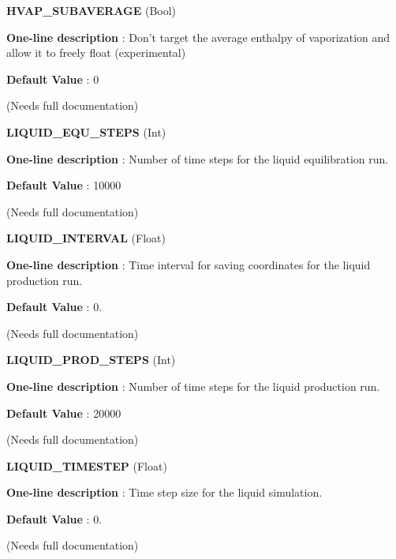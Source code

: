 \begin{DoxyItemize}
\item {\bfseries  \-H\-V\-A\-P\-\_\-\-S\-U\-B\-A\-V\-E\-R\-A\-G\-E } (\-Bool) \par
{\bfseries  \-One-\/line description }\-: \-Don't target the average enthalpy of vaporization and allow it to freely float (experimental) \par
{\bfseries  \-Default \-Value }\-: 0 \par
(\-Needs full documentation)\end{DoxyItemize}
\begin{DoxyItemize}
\item {\bfseries  \-L\-I\-Q\-U\-I\-D\-\_\-\-E\-Q\-U\-\_\-\-S\-T\-E\-P\-S } (\-Int) \par
{\bfseries  \-One-\/line description }\-: \-Number of time steps for the liquid equilibration run. \par
{\bfseries  \-Default \-Value }\-: 10000 \par
(\-Needs full documentation)\end{DoxyItemize}
\begin{DoxyItemize}
\item {\bfseries  \-L\-I\-Q\-U\-I\-D\-\_\-\-I\-N\-T\-E\-R\-V\-A\-L } (\-Float) \par
{\bfseries  \-One-\/line description }\-: \-Time interval for saving coordinates for the liquid production run. \par
{\bfseries  \-Default \-Value }\-: 0. \par
(\-Needs full documentation)\end{DoxyItemize}
\begin{DoxyItemize}
\item {\bfseries  \-L\-I\-Q\-U\-I\-D\-\_\-\-P\-R\-O\-D\-\_\-\-S\-T\-E\-P\-S } (\-Int) \par
{\bfseries  \-One-\/line description }\-: \-Number of time steps for the liquid production run. \par
{\bfseries  \-Default \-Value }\-: 20000 \par
(\-Needs full documentation)\end{DoxyItemize}
\begin{DoxyItemize}
\item {\bfseries  \-L\-I\-Q\-U\-I\-D\-\_\-\-T\-I\-M\-E\-S\-T\-E\-P } (\-Float) \par
{\bfseries  \-One-\/line description }\-: \-Time step size for the liquid simulation. \par
{\bfseries  \-Default \-Value }\-: 0. \par
(\-Needs full documentation)\end{DoxyItemize}
